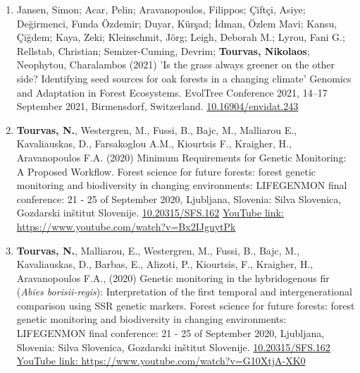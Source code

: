 \documentclass[12pt,]{scrartcl}
\begin{document}
\vspace{-3mm}
\begin{enumerate}
\leftskip-0.13in
	\setcounter{enumi}{3}
	
\leftskip-0.07in  

\leftskip-0.07in  

\item Jansen, Simon; Acar, Pelin; Aravanopoulos, Filippos; Çiftçi, Asiye; Değirmenci, Funda Özdemir; Duyar, Kürşad; İdman, Özlem Mavi; Kansu, Çiğdem; Kaya, 
Zeki; Kleinschmit, Jörg; Leigh, Deborah M.; Lyrou, Fani G.; Rellstab, Christian; 
Semizer-Cuming, Devrim; \textbf{Tourvas, Nikolaos}; Neophytou, Charalambos (2021) 'Is the grass always greener on the other side? Identifying seed sources for oak forests in a changing climate' Genomics and Adaptation in Forest Ecosystems. EvolTree Conference 2021, 14–17 September 2021, Birmensdorf, Switzerland. \href{http://doi.org/10.16904/envidat.243}{10.16904/envidat.243}

\item \textbf{Tourvas, N.}, Westergren, M., Fussi,  B.,  Bajc,  M.,  Malliarou  E.,  Kavaliauskas,  D.,  Farsakoglou A.M., Kiourtsis F., Kraigher, H., Aravanopoulos F.A. (2020) Minimum Requirements for Genetic Monitoring: A Proposed Workflow. Forest science for future forests: forest genetic monitoring and biodiversity in changing environments: LIFEGENMON final conference: 21 - 25 of September 2020, Ljubljana, Slovenia: Silva Slovenica, Gozdarski inštitut Slovenije. 
\href{http://doi.org/10.20315/SFS.162}{10.20315/SFS.162}
\newline
\href{https://www.youtube.com/watch?v=Bx2IJguytPk}{YouTube link: https://www.youtube.com/watch?v=Bx2IJguytPk}

\item \textbf{Tourvas, N.}, Malliarou, E., Westergren, M., Fussi, B., Bajc, M., Kavaliauskas, D., Barbas, E., Alizoti, P., Kiourtsis, F., Kraigher, H., Aravanopoulos F.A., (2020) Genetic monitoring in the hybridogenous fir (\textit{Abies borisii-regis}): Interpretation of the first temporal and intergenerational comparison using SSR genetic markers. Forest science for future forests: forest genetic monitoring and biodiversity in changing environments: LIFEGENMON final conference: 21 - 25 of September 2020, Ljubljana, Slovenia: Silva Slovenica, Gozdarski inštitut Slovenije. \href{http://doi.org/10.20315/SFS.162}{10.20315/SFS.162}
\newline
\href{https://www.youtube.com/watch?v=G10XtjA-XK0}{YouTube link: https://www.youtube.com/watch?v=G10XtjA-XK0}


\end{enumerate}
\end{document}
